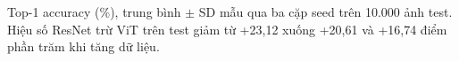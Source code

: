 Top-1 accuracy (\%), trung bình $\pm$ SD mẫu qua ba cặp seed trên 10.000 ảnh test. Hiệu số ResNet trừ ViT trên test giảm từ +23,12 xuống +20,61 và +16,74 điểm phần trăm khi tăng dữ liệu.
